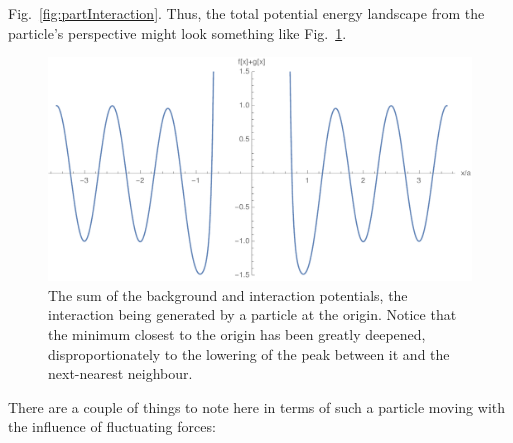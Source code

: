 Fig.~\ref{fig:partInteraction}. Thus, the 
total potential energy landscape from the particle's perspective might look something like 
Fig.~\ref{fig:fullPot}.
\begin{figure} \caption[The sum of the background and interaction potentials.]{The sum of the background
and interaction potentials, the interaction being generated by a particle at the origin. Notice that
the minimum closest to the origin has been greatly deepened, disproportionately to the lowering
of the peak between it and the next-nearest neighbour.} 
\label{fig:fullPot}
\begin{center}
\includegraphics[width=1.0\textwidth]{intro/images/fgSumPlot}
\end{center}
\end{figure}
There are a couple of things to note here in terms of such a particle moving with
the influence of fluctuating forces:
